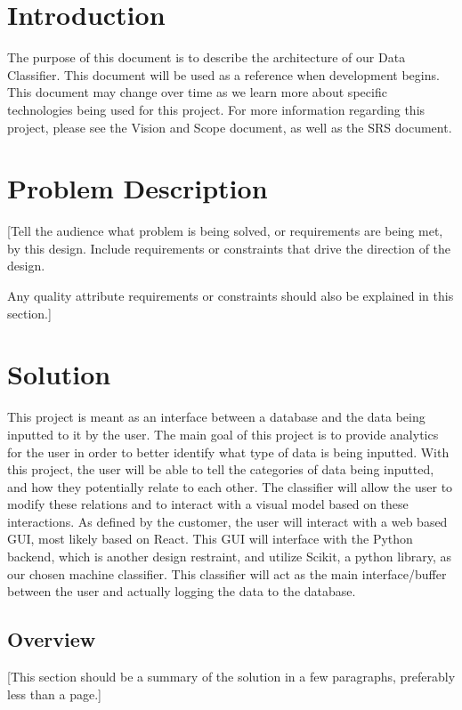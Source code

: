\documentclass[12pt,oneside,letterpaper]{article}
\begin{document}
\newpage

\section{Introduction}

The purpose of this document is to describe the architecture of our Data Classifier. This document will be used as a reference when development begins. This document may change over time as we learn more about specific technologies being used for this project. For more information regarding this project, please see the Vision and Scope document, as well as the SRS document.

\section{Problem Description}
[Tell the audience what problem is being solved, or requirements are being met, by this design.  Include requirements or constraints that drive the direction of the design.

Any quality attribute requirements or constraints should also be explained in this section.]



\section{Solution}
This project is meant as an interface between a database and the data being inputted to it by the user. The main goal of this project is to provide analytics for the user in order to better identify what type of data is being inputted. With this project, the user will be able to tell the categories of data being inputted, and how they potentially relate to each other. The classifier will allow the user to modify these relations and to interact with a visual model based on these interactions. As defined by the customer, the user will interact with a web based GUI, most likely based on React. This GUI will interface with the Python backend, which is another design restraint, and utilize Scikit, a python library, as our chosen machine classifier. This classifier will act as the main interface/buffer between the user and actually logging the data to the database. 

\subsection{Overview}
[This section should be a summary of the solution in a few paragraphs, preferably less than a page.]
\end{document}
